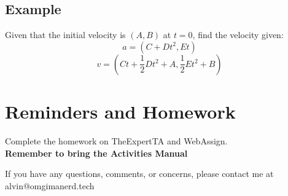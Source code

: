 \documentclass[letterpaper, 12pt]{math}
\begin{document}
\subsection*{Example}
Given that the initial velocity is \( (A,B) \) at \( t = 0 \), find
the velocity given:
\[ a = (C+Dt^2,Et) \]
\[ v = (Ct+\frac{1}{2}Dt^2+A,\frac{1}{2}Et^2+B) \]

\section*{Reminders and Homework}
Complete the homework on TheExpertTA and WebAssign. \\
\textbf{Remember to bring the Activities Manual}

\begin{center}
  If you have any questions, comments, or concerns, please contact me at
  alvin@omgimanerd.tech
\end{center}
\end{document}
